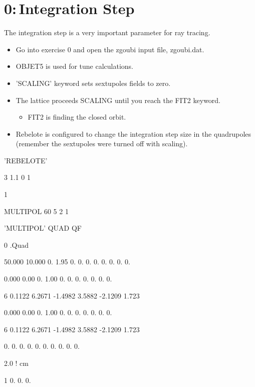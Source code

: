 \documentclass{beamer}
\begin{document}
\section{0:\,Integration Step}
\begin{frame}
The integration step is a very important parameter for ray tracing.
\begin{itemize}
\item Go into exercise 0 and open the zgoubi input file, zgoubi.dat.
\item OBJET5 is used for tune calculations.
\item 'SCALING' keyword sets sextupoles fields to zero.
\item The lattice proceeds SCALING until you reach the FIT2 keyword.
\begin{itemize}
\item FIT2 is finding the closed orbit.
\end{itemize}
\item Rebelote is configured to change the integration step size in the quadrupoles (remember the sextupoles were turned off with scaling).
\end{itemize}
\tiny
\hspace*{0.2\textwidth}
\begin{minipage}{0.2\textwidth}


'REBELOTE'
                                                                   
3 1.1 0 1

1

MULTIPOL 60  5 2 1
\end{minipage}
\hspace{0.1\textwidth}
\begin{minipage}{0.4\textwidth}
 'MULTIPOL'  QUAD  QF    

0  .Quad

50.000  10.000  0.  1.95  0.  0.  0.  0.  0.  0.  0.  0.

0.000   0.00   0.  1.00  0.  0.  0.  0.  0.  0.  0.

6  0.1122 6.2671 -1.4982 3.5882 -2.1209 1.723

0.000   0.00   0.  1.00  0.  0.  0.  0.  0.  0.  0.

6  0.1122 6.2671 -1.4982 3.5882 -2.1209 1.723

0.  0.  0.  0.  0.  0.  0.  0.  0.  0.

2.0  ! cm

1 0. 0. 0.
\end{minipage}
\end{frame}
\end{document}
